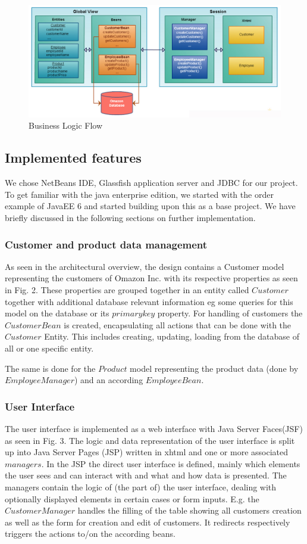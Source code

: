 \documentclass[twoside,colorbacktitle,accentcolor=tud1b]{tudexercise}
\begin{document}
\begin{figure}[h!]
  \centering
   \includegraphics[width=17cm]{BusinessLogic}
   \caption{Business Logic Flow}
\end{figure}
\clearpage
 \subsection{Implemented features}
  We chose NetBeans IDE, Glassfish application server and JDBC for our project. To get familiar with the java enterprise edition, we started with the order example of JavaEE 6 and started building upon this as a base project. We have briefly discussed in the following sections on further implementation. 

\subsubsection{Customer and product data management}

As seen in the architectural overview, the design contains a Customer model representing the customers of Omazon Inc. with its respective properties as seen in Fig. 2.
These properties are grouped together in an entity called $Customer$ together with additional database relevant information eg some queries for this model on the database or its $primary key$ property.
For handling of customers the $CustomerBean$ is created, encapsulating all actions that can be done with the $Customer$ Entity.
This includes creating, updating, loading from the database of all or one specific entity.

The same is done for the $Product$ model representing the product data (done by $EmployeeManager$) and an according $EmployeeBean$.

\subsubsection{User Interface}
The user interface is implemented as a web interface with Java Server Faces(JSF) as seen in Fig. 3.
The logic and data representation of the user interface is split up into Java Server Pages (JSP) written in xhtml and one or more associated $managers$.
In the JSP the direct user interface is defined, mainly which elements the user sees and can interact with and what and how data is presented.
The managers contain the logic of (the part of) the user interface, dealing with optionally displayed elements in certain cases or form inputs.
E.g. the $CustomerManager$ handles the filling of the table showing all customers creation as well as the form for creation and edit of customers.
It redirects respectively triggers the actions to/on the according beans.
\end{document}
